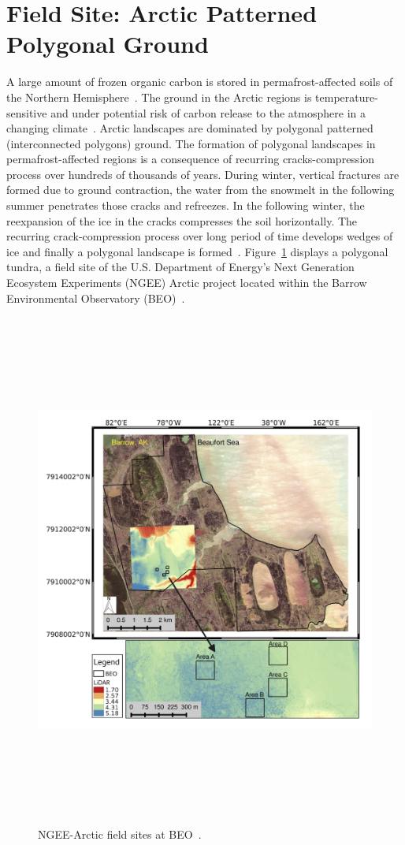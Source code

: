 \documentclass[review,11pt]{elsarticle}
\begin{document}
\section{Field Site: Arctic Patterned Polygonal Ground}\label{field-site}
A large amount of frozen organic carbon is stored in permafrost-affected soils of the Northern Hemisphere~\cite{schuur2015climate,bg-11-6573-2014}. The ground in the Arctic regions is temperature-sensitive and under potential risk of carbon release to the atmosphere in a changing climate~\cite{hinzman2005evidence}.
Arctic landscapes are dominated by polygonal patterned (interconnected polygons) ground. The formation of polygonal landscapes in permafrost-affected regions is a consequence of recurring cracks-compression process over hundreds of thousands of years. During winter, vertical fractures are formed due to ground contraction, the water from the snowmelt in the following summer penetrates those cracks and refreezes. In the following winter, the reexpansion of the ice in the cracks compresses the soil horizontally. The recurring crack-compression process over long period of time develops wedges of ice and finally a polygonal landscape is formed~\cite{lachenbruch1962mechanics,greene1963contraction,mackay1990some,mackay2004thermally}. Figure~\ref{ngee-arctic-fieldsites} displays a polygonal tundra, a field site of the U.S. Department of Energy's Next Generation Ecosystem Experiments (NGEE) Arctic project located within the Barrow Environmental Observatory (BEO)~\cite{kumar2016modeling}.
\begin{figure}[!h]
\centering
 \includegraphics[width=14cm, height=17cm]{./figures/ngee-arctic-fieldsites.png}
\caption{NGEE-Arctic field sites at BEO~\cite{kumar2016modeling}.}
\label{ngee-arctic-fieldsites}
\end{figure}
\end{document}
